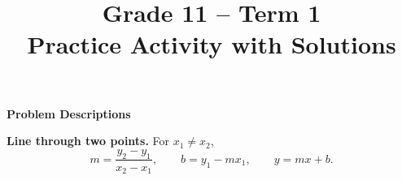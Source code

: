 \makeatletter
{}
\makeatother








\title{Grade 11 -- Term 1 \\ Practice Activity with Solutions}
\author{}
\date{}

\pagestyle{empty}

\newcommand{\SolvedGraph}[2]{%
	\par\smallskip
	\Needspace{4.6cm}%
	\begin{center}
		\textbf{\small #1}\par\vspace{-1mm}
		\resizebox{0.39\textwidth}{!}{%
			\begin{minipage}{10cm}
				#2
			\end{minipage}%
		}
	\end{center}
	\vspace{-2mm}%
}

\newcommand{\SolutionStage}[2]{%
	\Needspace{6\baselineskip}%
	\subsection{#2}%
}


	
	
	
	\vspace*{-15mm}
	
	\begin{center}
		{\large\bfseries Problem Descriptions}
	\end{center}
	
	\vspace{-4mm}
	
	\noindent\textbf{Line through two points.}  For $x_1\ne x_2$,
	\[
	m=\frac{y_2-y_1}{x_2-x_1},\qquad
	b=y_1-mx_1,\qquad
	y=mx+b.
	\]
	
